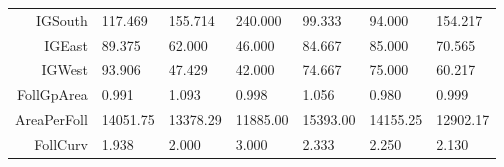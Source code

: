 \begin{landscape}
\begin{table}[ht]
\begin{tabular}{rllllll}
  IGSouth & 117.469 & 155.714 & 240.000 &  99.333 &  94.000 & 154.217 \\ 
  IGEast & 89.375 & 62.000 & 46.000 & 84.667 & 85.000 & 70.565 \\ 
  IGWest & 93.906 & 47.429 & 42.000 & 74.667 & 75.000 & 60.217 \\ 
  FollGpArea & 0.991 & 1.093 & 0.998 & 1.056 & 0.980 & 0.999 \\ 
  AreaPerFoll & 14051.75 & 13378.29 & 11885.00 & 15393.00 & 14155.25 & 12902.17 \\ 
  FollCurv & 1.938 & 2.000 & 3.000 & 2.333 & 2.250 & 2.130 \\ 
   \hline
\end{tabular}
\end{table}
\end{landscape}
